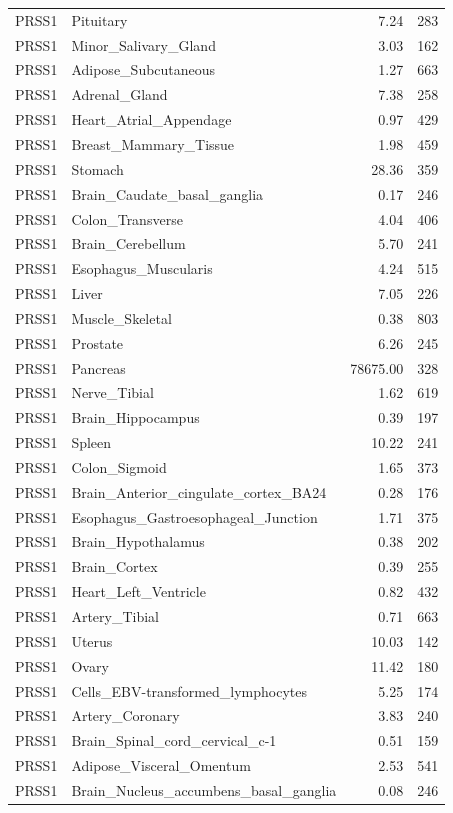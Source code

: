 \begin{footnotesize}
\begin{longtable}{llrr}
PRSS1 & Pituitary & 7.24 & 283 \\
PRSS1 & Minor\_Salivary\_Gland & 3.03 & 162 \\
PRSS1 & Adipose\_Subcutaneous & 1.27 & 663 \\
PRSS1 & Adrenal\_Gland & 7.38 & 258 \\
PRSS1 & Heart\_Atrial\_Appendage & 0.97 & 429 \\
PRSS1 & Breast\_Mammary\_Tissue & 1.98 & 459 \\
PRSS1 & Stomach & 28.36 & 359 \\
PRSS1 & Brain\_Caudate\_basal\_ganglia & 0.17 & 246 \\
PRSS1 & Colon\_Transverse & 4.04 & 406 \\
PRSS1 & Brain\_Cerebellum & 5.70 & 241 \\
PRSS1 & Esophagus\_Muscularis & 4.24 & 515 \\
PRSS1 & Liver & 7.05 & 226 \\
PRSS1 & Muscle\_Skeletal & 0.38 & 803 \\
PRSS1 & Prostate & 6.26 & 245 \\
PRSS1 & Pancreas & 78675.00 & 328 \\
PRSS1 & Nerve\_Tibial & 1.62 & 619 \\
PRSS1 & Brain\_Hippocampus & 0.39 & 197 \\
PRSS1 & Spleen & 10.22 & 241 \\
PRSS1 & Colon\_Sigmoid & 1.65 & 373 \\
PRSS1 & Brain\_Anterior\_cingulate\_cortex\_BA24 & 0.28 & 176 \\
PRSS1 & Esophagus\_Gastroesophageal\_Junction & 1.71 & 375 \\
PRSS1 & Brain\_Hypothalamus & 0.38 & 202 \\
PRSS1 & Brain\_Cortex & 0.39 & 255 \\
PRSS1 & Heart\_Left\_Ventricle & 0.82 & 432 \\
PRSS1 & Artery\_Tibial & 0.71 & 663 \\
PRSS1 & Uterus & 10.03 & 142 \\
PRSS1 & Ovary & 11.42 & 180 \\
PRSS1 & Cells\_EBV-transformed\_lymphocytes & 5.25 & 174 \\
PRSS1 & Artery\_Coronary & 3.83 & 240 \\
PRSS1 & Brain\_Spinal\_cord\_cervical\_c-1 & 0.51 & 159 \\
PRSS1 & Adipose\_Visceral\_Omentum & 2.53 & 541 \\
PRSS1 & Brain\_Nucleus\_accumbens\_basal\_ganglia & 0.08 & 246 \\

\end{longtable}
\end{footnotesize}

